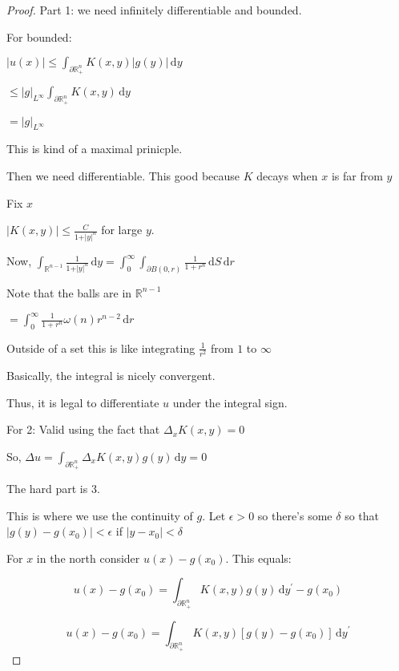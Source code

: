 \documentclass{article}
\theoremstyle{definition}
\begin{document}
\begin{proof}
    Part 1: we need infinitely differentiable and bounded.

    For bounded:

    \(\vert u(x) \vert \leq \int_{\partial \mathbb{R}^n_+}^{} K(x,y)\vert g(y) \vert  \,\mathrm{d}y \) 

    \(\leq \vert g \vert _{L^{\infty}} \int_{\partial \mathbb{R} ^n_+}^{} K(x,y) \,\mathrm{d}y \) 

    \(= \vert g \vert _{L^{\infty}}\) 

    This is kind of a maximal prinicple.

    Then we need differentiable. This good because \(K\) decays when \(x\) is far from \(y\) 

    Fix \(x\) 

    \(\vert K(x,y) \vert \leq \frac{C}{1 + \vert y \vert ^n}\) for large \(y\).
    
    Now, \(\int_{\mathbb{R} ^{n-1}}^{} \frac{1}{1+\vert y \vert ^n} \,\mathrm{d}y = \int_{0}^{\infty} \int_{\partial B(0,r)}^{} \frac{1}{1+r^n} \,\mathrm{d}S  \,\mathrm{d}r \) 

    Note that the balls are in \(\mathbb{R}^{n-1}\) 

    \(=\int_{0}^{\infty} \frac{1}{1+r^n} \omega (n)r^{n-2} \,\mathrm{d}r \) 

    Outside of a set this is like integrating \(\frac{1}{r^2}\) from \(1\) to \(\infty\) 

    Basically, the integral is nicely convergent.

    Thus, it is legal to differentiate \(u\) under the integral sign.

    For 2: Valid using the fact that \(\Delta _x K(x,y)=0\) 

    So, \(\Delta u = \int_{\partial \mathbb{R} ^n_+}^{} \Delta _x K(x,y)g(y) \,\mathrm{d}y = 0 \) 

    The hard part is 3.

    This is where we use the continuity of \(g\). Let \(\epsilon > 0\) so there's some \(\delta \) so that \(\vert g(y) - g(x_0) \vert < \epsilon\) if \(\vert y - x_0 \vert < \delta\) 

    For \(x\) in the north consider \(u(x)-g(x_0)\). This equals:

    \[
        u(x)-g(x_0)=\int_{\partial \mathbb{R} ^n_+}^{} K(x,y)g(y) \,\mathrm{d}y^{\prime} -g(x_0) 
    \]

    \[
        u(x)-g(x_0)=\int_{\partial \mathbb{R} ^n_+}^{} K(x,y)[g(y)-g(x_0)] \,\mathrm{d}y^{\prime}
    \]


\end{proof}
\end{document}
